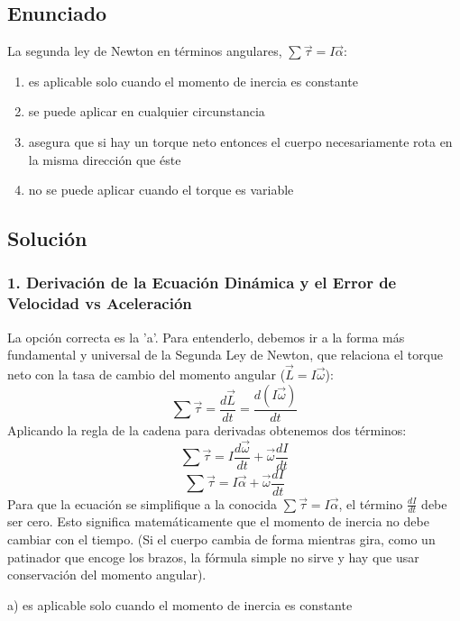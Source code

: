 \documentclass[12pt, a4paper]{article}
\begin{document}
\newpage

\subsection*{Enunciado}
La segunda ley de Newton en términos angulares, $\sum \vec{\tau} = I \vec{\alpha}$:
\begin{enumerate}[label=\alph*)]
    \item es aplicable solo cuando el momento de inercia es constante
    \item se puede aplicar en cualquier circunstancia
    \item asegura que si hay un torque neto entonces el cuerpo necesariamente rota en la misma dirección que éste
    \item no se puede aplicar cuando el torque es variable
\end{enumerate}

\subsection*{Solución}

\subsubsection*{1. Derivación de la Ecuación Dinámica y el Error de Velocidad vs Aceleración}

La opción correcta es la 'a'. Para entenderlo, debemos ir a la forma más fundamental y universal de la Segunda Ley de Newton, que relaciona el torque neto con la tasa de cambio del momento angular ($\vec{L} = I\vec{\omega}$):
$$\sum \vec{\tau} = \frac{d\vec{L}}{dt} = \frac{d(I\vec{\omega})}{dt}$$
Aplicando la regla de la cadena para derivadas obtenemos dos términos:
$$\sum \vec{\tau} = I\frac{d\vec{\omega}}{dt} + \vec{\omega}\frac{dI}{dt}$$
$$\sum \vec{\tau} = I\vec{\alpha} + \vec{\omega}\frac{dI}{dt}$$
Para que la ecuación se simplifique a la conocida $\sum \vec{\tau} = I \vec{\alpha}$, el término $\frac{dI}{dt}$ debe ser cero. Esto significa matemáticamente que el momento de inercia no debe cambiar con el tiempo. (Si el cuerpo cambia de forma mientras gira, como un patinador que encoge los brazos, la fórmula simple no sirve y hay que usar conservación del momento angular).

\begin{tcolorbox}[colback=green!5!white, colframe=green!50!black, title=Respuesta Final]
\centering \Large a) es aplicable solo cuando el momento de inercia es constante
\end{tcolorbox}
\end{document}
